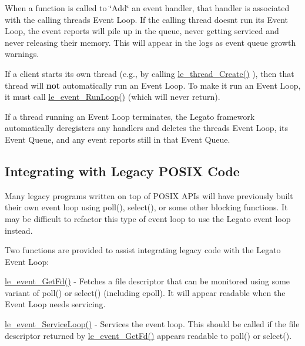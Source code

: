 When a function is called to \char`\"{}\+Add\char`\"{} an event handler, that handler is associated with the calling thread\textquotesingle{}s Event Loop. If the calling thread doesn\textquotesingle{}t run its Event Loop, the event reports will pile up in the queue, never getting serviced and never releasing their memory. This will appear in the logs as event queue growth warnings.

If a client starts its own thread (e.\+g., by calling \hyperlink{le__thread_8h_a87e02a46f92e9e3e11ed28a2b265872f}{le\+\_\+thread\+\_\+\+Create()} ), then that thread will {\bfseries not} automatically run an Event Loop. To make it run an Event Loop, it must call {\ttfamily \hyperlink{le__event_loop_8h_ae313b457994371c658be9fe0494a01ff}{le\+\_\+event\+\_\+\+Run\+Loop()}} (which will never return).

If a thread running an Event Loop terminates, the Legato framework automatically deregisters any handlers and deletes the thread\textquotesingle{}s Event Loop, its Event Queue, and any event reports still in that Event Queue.\hypertarget{c_event_loop_c_event_integratingLegacyPosix}{}\subsection{Integrating with Legacy P\+O\+S\+I\+X Code}\label{c_event_loop_c_event_integratingLegacyPosix}
Many legacy programs written on top of P\+O\+S\+I\+X A\+P\+Is will have previously built their own event loop using poll(), select(), or some other blocking functions. It may be difficult to refactor this type of event loop to use the Legato event loop instead.

Two functions are provided to assist integrating legacy code with the Legato Event Loop\+:
\begin{DoxyItemize}
\item {\ttfamily \hyperlink{le__event_loop_8h_a12ce7f92f4bc6f5167d5a6ef86d7d0b1}{le\+\_\+event\+\_\+\+Get\+Fd()}} -\/ Fetches a file descriptor that can be monitored using some variant of poll() or select() (including epoll). It will appear readable when the Event Loop needs servicing.
\item {\ttfamily \hyperlink{le__event_loop_8h_a096222e98f6a0d92a79722018a752b58}{le\+\_\+event\+\_\+\+Service\+Loop()}} -\/ Services the event loop. This should be called if the file descriptor returned by \hyperlink{le__event_loop_8h_a12ce7f92f4bc6f5167d5a6ef86d7d0b1}{le\+\_\+event\+\_\+\+Get\+Fd()} appears readable to poll() or select().
\end{DoxyItemize}

